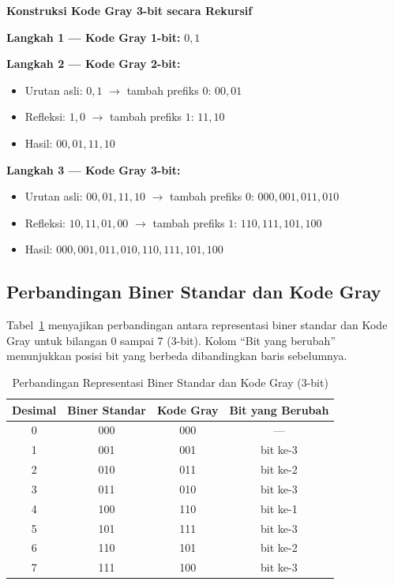 \begin{contoh}
\textbf{Konstruksi Kode Gray 3-bit secara Rekursif}

\textbf{Langkah 1 --- Kode Gray 1-bit:} $0, 1$

\textbf{Langkah 2 --- Kode Gray 2-bit:}
\begin{itemize}
  \item Urutan asli: $0, 1$ $\rightarrow$ tambah prefiks $0$: $00, 01$
  \item Refleksi: $1, 0$ $\rightarrow$ tambah prefiks $1$: $11, 10$
  \item Hasil: $00, 01, 11, 10$
\end{itemize}

\textbf{Langkah 3 --- Kode Gray 3-bit:}
\begin{itemize}
  \item Urutan asli: $00, 01, 11, 10$ $\rightarrow$ tambah prefiks $0$: $000, 001, 011, 010$
  \item Refleksi: $10, 11, 01, 00$ $\rightarrow$ tambah prefiks $1$: $110, 111, 101, 100$
  \item Hasil: $000, 001, 011, 010, 110, 111, 101, 100$
\end{itemize}
\end{contoh}

\subsection{Perbandingan Biner Standar dan Kode Gray}

Tabel~\ref{tab:biner-vs-gray} menyajikan perbandingan antara representasi biner standar dan Kode Gray untuk bilangan 0 sampai 7 (3-bit). Kolom ``Bit yang berubah'' menunjukkan posisi bit yang berbeda dibandingkan baris sebelumnya.

\begin{table}[H]
\centering
\renewcommand{\arraystretch}{1.3}
\begin{tabular}{|c|c|c|c|}
\hline
\textbf{Desimal} & \textbf{Biner Standar} & \textbf{Kode Gray} & \textbf{Bit yang Berubah} \\ \hline
0 & 000 & 000 & --- \\ \hline
1 & 001 & 001 & bit ke-3 \\ \hline
2 & 010 & 011 & bit ke-2 \\ \hline
3 & 011 & 010 & bit ke-3 \\ \hline
4 & 100 & 110 & bit ke-1 \\ \hline
5 & 101 & 111 & bit ke-3 \\ \hline
6 & 110 & 101 & bit ke-2 \\ \hline
7 & 111 & 100 & bit ke-3 \\ \hline
\end{tabular}
\caption{Perbandingan Representasi Biner Standar dan Kode Gray (3-bit)}
\label{tab:biner-vs-gray}
\end{table}

